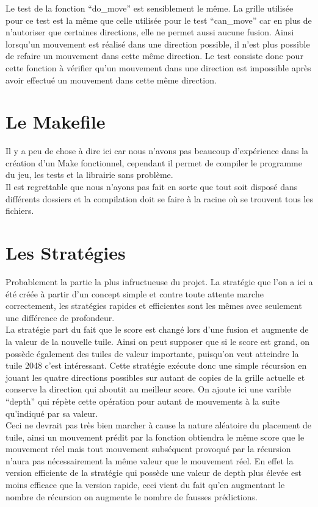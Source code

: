 \documentclass[12pt]{article}
\begin{document}
Le test de la fonction ``do\_move'' est sensiblement le même. La grille utilisée pour ce test est la même que celle utilisée pour le test ``can\_move'' car en plus de n'autoriser que certaines directions, elle ne permet aussi aucune fusion. Ainsi lorsqu'un mouvement est réalisé dans une direction possible, il n'est plus possible de refaire un mouvement dans cette même direction. Le test consiste donc pour cette fonction à vérifier qu'un mouvement dans une direction est impossible après avoir effectué un mouvement dans cette même direction.

\section{Le Makefile}

Il y a peu de chose à dire ici car nous n'avons pas beaucoup d'expérience dans la création d'un Make fonctionnel, cependant il permet de compiler le programme du jeu, les tests et la librairie sans problème.\\

Il est regrettable que nous n'ayons pas fait en sorte que tout soit disposé dans différents dossiers et la compilation doit se faire à la racine où se trouvent tous les fichiers.

\section{Les Stratégies}

Probablement la partie la plus infructueuse du projet. La stratégie que l'on a ici a été créée à partir d'un concept simple et contre toute attente marche correctement, les stratégies rapides et efficientes sont les mêmes avec seulement une différence de profondeur.\\

La stratégie part du fait que le score est changé lors d'une fusion et augmente de la valeur de la nouvelle tuile. Ainsi on peut supposer que si le score est grand, on possède également des tuiles de valeur importante, puisqu'on veut atteindre la tuile 2048 c'est intéressant. Cette stratégie exécute donc une simple récursion en jouant les quatre directions possibles sur autant de copies de la grille actuelle et conserve la direction qui aboutit au meilleur score. On ajoute ici une varible ``depth'' qui répète cette opération pour autant de mouvements à la suite qu'indiqué par sa valeur.\\

Ceci ne devrait pas très bien marcher à cause la nature aléatoire du placement de tuile, ainsi un mouvement prédit par la fonction obtiendra le même score que le mouvement réel mais tout mouvement subséquent provoqué par la récursion n'aura pas nécessairement la même valeur que le mouvement réel. En effet la version efficiente de la stratégie qui possède une valeur de depth plus élevée est moins efficace que la version rapide, ceci vient du fait qu'en augmentant le nombre de récursion on augmente le nombre de fausses prédictions.\\
\end{document}
